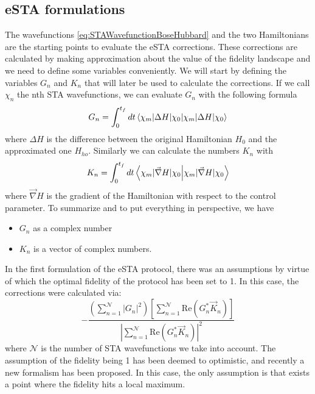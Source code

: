\documentclass{article}
\begin{document}
\subsection{eSTA formulations}\label{sec:eSTAFormulation} %
The wavefunctions \cref{eq:STAWavefunctionBoseHubbard} and the two Hamiltonians are the starting points to evaluate the eSTA corrections.
These corrections are calculated by making approximation about the value of the fidelity landscape and we need to define some variables conveniently.
We will start by defining the variables $G_n$ and $ K_{n} $ that will later be used to calculate the corrections.
If we call $ \chi_{n} $ the nth STA wavefunctions, we can evaluate $ G_n $ with the following formula
\begin{equation}
	G_{n} = \int_{0}^{t_{f}} dt \braket{\chi_{m}|\Delta H |\chi_{0}}
	\label{eq:Gn}
\end{equation}
where $ \Delta H $ is the difference between the original Hamiltonian $ H_{0} $ and the approximated one $ H_{ho} $.
Similarly we can calculate the numbers $ K_{n} $ with
\begin{equation}
	K_{n} = \int_{0}^{t_{f}} dt \braket{\chi_{m}|\vec{\nabla} H|\chi_{0}}
	\label{eq:Kn}
\end{equation}
where $ \vec{\nabla} H$ is the gradient of the Hamiltonian with respect to the control parameter.
To summarize and to put everything in perspective, we have
\begin{itemize}
	\item  $ G_{n} $ as a complex number
	\item  $ K_{n} $ is a vector of complex numbers.
\end{itemize}
In the first formulation of the eSTA protocol, there was an assumptions by virtue of which the optimal fidelity of the protocol has been set to 1.
In this case, the corrections were calculated via:
\begin{equation}
	\label{eq:eSTAcorrections}
	-\frac
	{
	\left( \sum_{n=1}^{\mathcal{N}} |G_{n}|^2 \right)
	\left[ \sum_{n=1}^{\mathcal{N}}\text{Re}(G_{n}^{*}\vec{K}_{n})\right]
	}
	{\left|\sum_{n=1}^{\mathcal{N}}\text{Re}(G_{n}^{*}\vec{K}_{n})\right|^2 }
\end{equation}
where $ \mathcal{N} $ is the number of STA wavefunctions we take into account.
The assumption of the fidelity being 1 has been deemed to optimistic, and recently a new formalism has been proposed.
In this case, the only assumption is that exists a point where the fidelity hits a local maximum.
\end{document}
